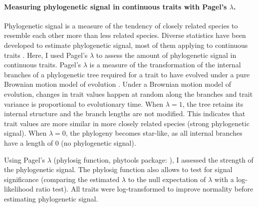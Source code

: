 \paragraph{Measuring phylogenetic signal in continuous traits with Pagel's $\lambda$.}
Phylogenetic signal is a measure of the tendency of closely related species to resemble each other more than less related species. Diverse statistics have been developed to estimate phylogenetic signal, most of them applying to continuous traits \citep{Munkemuller2012}. Here, I used Pagel's $\lambda$ \citep{Pagel1999} to assess the amount of phylogenetic signal in continuous traits. Pagel's $\lambda$ is a measure of the transformation of the internal branches of a phylogenetic tree required for a trait to have evolved under a pure Brownian motion model of evolution \citep{Munkemuller2012}. Under a Brownian motion model of evolution, changes in trait values happen at random along the branches and trait variance is proportional to evolutionary time.  When $\lambda=1$, the tree retains its internal structure and the branch lengths are not modified. This indicates that trait values are more similar in more closely related species (strong phylogenetic signal). When $\lambda=0$, the phylogeny becomes star-like, as all internal branches have a length of 0 (no phylogenetic signal).

Using Pagel's $\lambda$ (phylosig function, phytools package: \cite{Revell2016}), I assessed the strength of the phylogenetic signal. The phylosig function also allows to test for signal significance (comparing the estimated $\lambda$ to the null expectation of $\lambda$ with a log-likelihood ratio test). All traits were log-transformed to improve normality before estimating phylogenetic signal.


